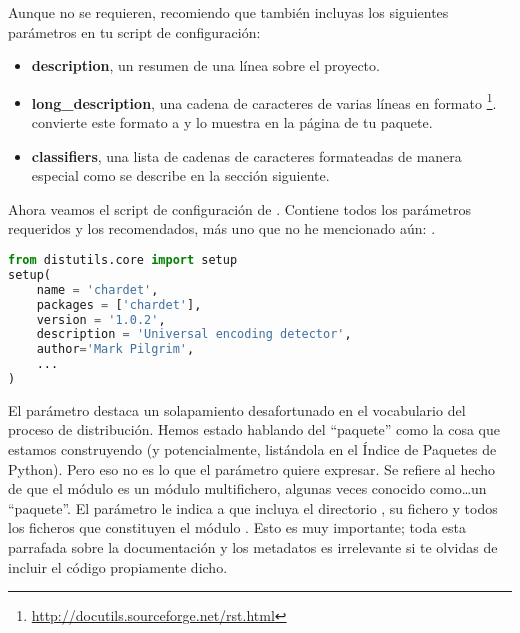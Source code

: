 Aunque no se requieren, recomiendo que también incluyas los siguientes parámetros en tu script de configuración:

\begin{itemize}
  \item \textbf{description}, un resumen de una línea sobre el proyecto.
  \item \textbf{long\_description}, una cadena de caracteres de varias líneas en formato \footnote{\href{http://docutils.sourceforge.net/rst.html}{http://docutils.sourceforge.net/rst.html}}.  convierte este formato a  y lo muestra en la página de tu paquete.
  \item \textbf{classifiers}, una lista de cadenas de caracteres formateadas de manera especial como se describe en la sección siguiente.
\end{itemize}


Ahora veamos el script de configuración de . Contiene todos los parámetros requeridos y los recomendados, más uno que no he mencionado aún: .


\begin{lstlisting}[language=Python,breaklines=true]
from distutils.core import setup
setup(
    name = 'chardet',
    packages = ['chardet'],
    version = '1.0.2',
    description = 'Universal encoding detector',
    author='Mark Pilgrim',
    ...
)
\end{lstlisting}

El parámetro  destaca un solapamiento desafortunado en el vocabulario del proceso de distribución. Hemos estado hablando del ``paquete'' como la cosa que estamos construyendo (y potencialmente, listándola en el Índice de Paquetes de Python). Pero eso no es lo que el parámetro  quiere expresar. Se refiere al hecho de que el módulo  es un módulo multifichero, algunas veces conocido como\ldots un ``paquete''. El parámetro  le indica a  que incluya el directorio , su fichero  y todos los ficheros  que constituyen el módulo . Esto es muy importante; toda esta parrafada sobre la documentación y los metadatos es irrelevante si te olvidas de incluir el código propiamente dicho.
